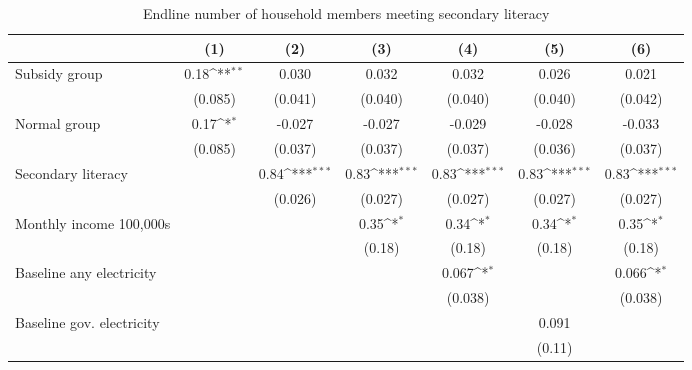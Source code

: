 \begin{table}[htbp]\centering
\def\sym#1{\ifmmode^{#1}\else\(^{#1}\)\fi}
\caption{Endline number of household members meeting secondary literacy}
\begin{tabular*}{1\hsize}{@{\hskip\tabcolsep\extracolsep\fill}l*{6}{c}}
\toprule
                &\multicolumn{1}{c}{(1)}         &\multicolumn{1}{c}{(2)}         &\multicolumn{1}{c}{(3)}         &\multicolumn{1}{c}{(4)}         &\multicolumn{1}{c}{(5)}         &\multicolumn{1}{c}{(6)}         \\
\midrule
Subsidy group   &     0.18\sym{**} &    0.030         &    0.032         &    0.032         &    0.026         &    0.021         \\
                &  (0.085)         &  (0.041)         &  (0.040)         &  (0.040)         &  (0.040)         &  (0.042)         \\
Normal group    &     0.17\sym{*}  &   -0.027         &   -0.027         &   -0.029         &   -0.028         &   -0.033         \\
                &  (0.085)         &  (0.037)         &  (0.037)         &  (0.037)         &  (0.036)         &  (0.037)         \\
Secondary literacy&                  &     0.84\sym{***}&     0.83\sym{***}&     0.83\sym{***}&     0.83\sym{***}&     0.83\sym{***}\\
                &                  &  (0.026)         &  (0.027)         &  (0.027)         &  (0.027)         &  (0.027)         \\
Monthly income 100,000s&                  &                  &     0.35\sym{*}  &     0.34\sym{*}  &     0.34\sym{*}  &     0.35\sym{*}  \\
                &                  &                  &   (0.18)         &   (0.18)         &   (0.18)         &   (0.18)         \\
Baseline any electricity&                  &                  &                  &    0.067\sym{*}  &                  &    0.066\sym{*}  \\
                &                  &                  &                  &  (0.038)         &                  &  (0.038)         \\
Baseline gov. electricity&                  &                  &                  &                  &    0.091         &                  \\
                &                  &                  &                  &                  &   (0.11)         &                  \\

\end{tabular*}
\end{table}
